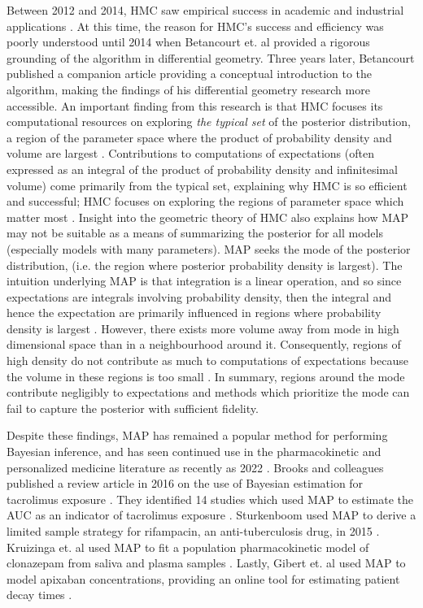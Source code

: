 Between 2012 and 2014, HMC saw empirical success in academic and industrial applications  \cite{betancourt2014geometric, Carpenter2017-qf}.  At this time, the reason for HMC's success and efficiency was poorly understood until 2014 when  Betancourt et. al \cite{betancourt2014geometric} provided a rigorous grounding of the algorithm in differential geometry.  Three years later, Betancourt published a companion article \cite{Betancourt2017-ak} providing a conceptual introduction to the algorithm, making the findings of his differential geometry research more accessible. An important finding from this research is that HMC focuses its computational resources on exploring \textit{the typical set} of the posterior distribution, a region of the parameter space where the product of probability density and volume are largest \cite{Betancourt2017-ak}.  Contributions to computations of expectations  (often expressed as an integral of the product of probability density and infinitesimal volume) come primarily from the typical set, explaining why HMC is so efficient and successful; HMC focuses on exploring the regions of parameter space which matter most \cite{Betancourt2017-ak}.  Insight into the geometric theory of HMC also explains how MAP may not be suitable as a means of summarizing the posterior for all models (especially models with many parameters).  MAP seeks the mode of the posterior distribution, (i.e. the region where posterior probability density is largest).  The intuition underlying MAP is that integration is a linear operation, and so since expectations are integrals involving probability density, then the integral and hence the expectation are primarily influenced in regions where probability density is largest \cite{Betancourt2017-ak}.  However, there exists more volume away from mode in high dimensional space than in a  neighbourhood around it.  Consequently, regions of high density do not contribute as much to computations of expectations because the volume in these regions is too small \cite{Betancourt2017-ak}.  In summary, regions around the mode contribute negligibly to expectations and methods which prioritize the mode can fail to capture the posterior with sufficient fidelity.

Despite these findings, MAP has remained a popular method for performing Bayesian inference, and has seen continued use in the pharmacokinetic and personalized medicine literature as recently as 2022 \cite{gibert2022development}.  Brooks and colleagues published a review article in 2016 on the use of Bayesian estimation for tacrolimus exposure \cite{Brooks2016-li}.  They identified 14 studies which used MAP to estimate the AUC as an indicator of tacrolimus exposure \cite{Brooks2016-li}.  Sturkenboom used MAP to derive a limited sample strategy for rifampacin, an anti-tuberculosis drug, in 2015 \cite{sturkenboom2021population, sturkenboom2015pharmacokinetic}. Kruizinga et. al used MAP to fit a population pharmacokinetic model of clonazepam from saliva and plasma samples \cite{kruizinga2022population}.  Lastly, Gibert et. al used MAP to model apixaban concentrations, providing an online tool for estimating patient decay times \cite{gibert2022development}.  

